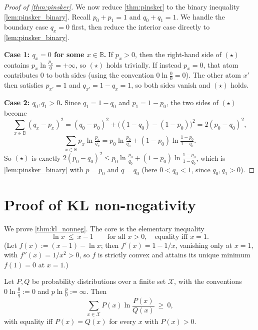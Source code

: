 \documentclass[fontsize=11pt, parskip=half]{scrartcl}
\begin{document}
\begin{proof}[Proof of \cref{thm:pinsker}]
    We now reduce \cref{thm:pinsker} to the binary inequality \cref{lem:pinsker_binary}.
    Recall $p_0 + p_1 = 1$ and $q_0 + q_1 = 1$. We handle the boundary case
$q_x = 0$ first, then reduce the interior case directly to
\cref{lem:pinsker_binary}.

\medskip
\textbf{Case 1: $q_x = 0$ for some $x \in \mathbb{B}$.}
If $p_x > 0$, then the right-hand side of $(\star)$ contains
$p_x \ln \tfrac{p_x}{0} = +\infty$, so $(\star)$ holds trivially.
If instead $p_x = 0$, that atom contributes $0$ to both sides
(using the convention $0 \ln \tfrac{0}{0} = 0$). The other atom $x'$ then
satisfies $p_{x'} = 1$ and $q_{x'} = 1 - q_x = 1$, so both sides vanish and
$(\star)$ holds.

\medskip
\textbf{Case 2: $q_0, q_1 > 0$.}
Since $q_1 = 1 - q_0$ and $p_1 = 1 - p_0$, the two sides of $(\star)$ become
\[
    \sum_{x \in \mathbb{B}} (q_x - p_x)^2
    = (q_0 - p_0)^2 + \big((1-q_0) - (1-p_0)\big)^2
    = 2(p_0 - q_0)^2,
\]
\[
    \sum_{x \in \mathbb{B}} p_x \ln \tfrac{p_x}{q_x}
    = p_0 \ln \tfrac{p_0}{q_0} + (1 - p_0) \ln \tfrac{1 - p_0}{1 - q_0}.
\]
So $(\star)$ is exactly
$2(p_0 - q_0)^2 \leq p_0 \ln \tfrac{p_0}{q_0} + (1 - p_0) \ln \tfrac{1 - p_0}{1 - q_0}$,
which is \cref{lem:pinsker_binary} with $p = p_0$ and $q = q_0$
(here $0 < q_0 < 1$, since $q_0, q_1 > 0$).
\end{proof}

\section{Proof of KL non-negativity}\label{app:kl_nonneg}

We prove \cref{thm:kl_nonneg}. The core is the elementary inequality
\[
  \ln x ~\leq~ x - 1 \qquad \text{for all } x > 0, \quad \text{equality iff } x = 1.
\]
(Let $f(x) := (x - 1) - \ln x$; then $f'(x) = 1 - 1/x$, vanishing only at $x = 1$, with $f''(x) = 1/x^2 > 0$, so $f$ is strictly convex and attains its unique minimum $f(1) = 0$ at $x = 1$.)

\begin{lemma}\label{lem:gibbs}
Let $P, Q$ be probability distributions over a finite set $\mathcal{X}$, with the conventions $0 \ln \tfrac{0}{q} := 0$ and $p \ln \tfrac{p}{0} := \infty$. Then
\[
  \sum_{x \in \mathcal{X}} P(x) \ln \frac{P(x)}{Q(x)} ~\geq~ 0,
\]
with equality iff $P(x) = Q(x)$ for every $x$ with $P(x) > 0$.
\end{lemma}
\end{document}
